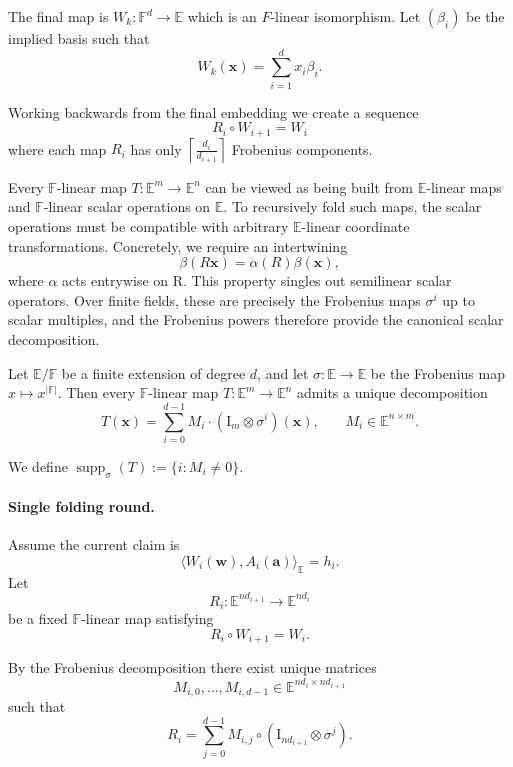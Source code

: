 The final map is $W_k : \mathbb{F}^d \to \mathbb{E}$ which is an $F$-linear isomorphism. Let $(\beta_i)$ be the implied basis such that 
\[
W_k(\mathbf x) = \sum_{i=1}^d x_i \beta_i \text{.}
\]

Working backwards from the final embedding we create a sequence
\[
R_i \circ W_{i+1} = W_i
\]
where each map $R_i$ has only $\left\lceil \frac{d_i}{d_{i+1}}\right\rceil$ Frobenius components.

\pagebreak
Every $\mathbb F$-linear map $T:\mathbb E^m\to\mathbb E^n$ can be viewed as being built from $\mathbb E$-linear maps and $\mathbb F$-linear scalar operations on $\mathbb E$. To recursively fold such maps, the scalar operations must be compatible with arbitrary $\mathbb E$-linear coordinate transformations. Concretely, we require an intertwining
\[
\beta(R\mathbf x)=\alpha(R)\beta(\mathbf x),
\]
where $\alpha$ acts entrywise on R. This property singles out semilinear scalar operators. Over finite fields, these are precisely the Frobenius maps $\sigma^i$ up to scalar multiples, and the Frobenius powers therefore provide the canonical scalar decomposition.


\begin{theorem}
Let $\mathbb E/\mathbb F$ be a finite extension of degree $d$, and let $\sigma: \mathbb{E} \to \mathbb{E}$ be the Frobenius map $x \mapsto x^{|\mathbb{F}|}$. Then every $\mathbb F$-linear map $T: \mathbb{E}^m \to \mathbb{E}^n$ admits a unique decomposition
\[
T(\mathbf{x}) = \sum_{i=0}^{d-1} M_i \cdot (\mathrm{I}_m \otimes \sigma^i)(\mathbf{x})
\text{,} \qquad M_i \in \mathbb{E}^{n \times m} \text{.}
\]
\end{theorem}
We define $\operatorname{supp}_\sigma(T) := \{i : M_i \neq 0\}$.

\paragraph{Single folding round.}
Assume the current claim is
\[
\langle W_i(\mathbf w),A_i(\mathbf a)\rangle_{\mathbb E}=h_i.
\]
Let
\[
R_i:\mathbb E^{nd_{i+1}}\to\mathbb E^{nd_i}
\]
be a fixed $\mathbb F$-linear map satisfying
\[
R_i\circ W_{i+1}=W_i.
\]

By the Frobenius decomposition there exist unique matrices
\[
M_{i,0},\ldots,M_{i,d-1}
\in
\mathbb E^{nd_i\times nd_{i+1}}
\]
such that
\[
R_i
=
\sum_{j=0}^{d-1}
M_{i,j}\circ
(\mathrm I_{nd_{i+1}}\otimes\sigma^j).
\]

